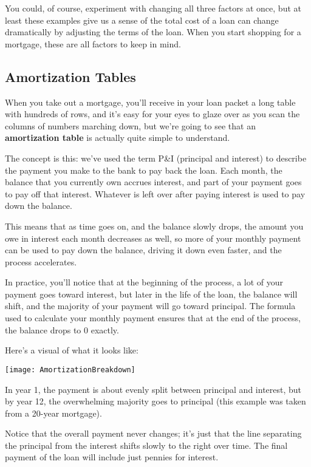 You could, of course, experiment with changing all three factors at once, but at least these examples give us a sense of the total cost of a loan can change dramatically by adjusting the terms of the loan.  When you start shopping for a mortgage, these are all factors to keep in mind.

\subsection{Amortization Tables}
When you take out a mortgage, you'll receive in your loan packet a long table with hundreds of rows, and it's easy for your eyes to glaze over as you scan the columns of numbers marching down, but we're going to see that an \textbf{amortization table} is actually quite simple to understand.

The concept is this: we've used the term P\&I (principal and interest) to describe the payment you make to the bank to pay back the loan.  Each month, the balance that you currently own accrues interest, and part of your payment goes to pay off that interest.  Whatever is left over after paying interest is used to pay down the balance.

This means that as time goes on, and the balance slowly drops, the amount you owe in interest each month decreases as well, so more of your monthly payment can be used to pay down the balance, driving it down even faster, and the process accelerates.

In practice, you'll notice that at the beginning of the process, a lot of your payment goes toward interest, but later in the life of the loan, the balance will shift, and the majority of your payment will go toward principal.  The formula used to calculate your monthly payment ensures that at the end of the process, the balance drops to 0 exactly.

Here's a visual of what it looks like:
\begin{center}
\texttt{[image: AmortizationBreakdown]}
\end{center}
In year 1, the payment is about evenly split between principal and interest, but by year 12, the overwhelming majority goes to principal (this example was taken from a 20-year mortgage).

Notice that the overall payment never changes; it's just that the line separating the principal from the interest shifts slowly to the right over time.  The final payment of the loan will include just pennies for interest.

